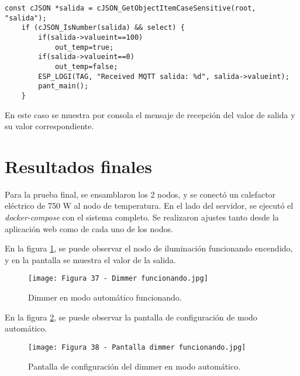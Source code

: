 
\begin{lstlisting}[caption={Muestra por consola de la terminal ESP-IDF.}, label={lst:dispositivo}]
const cJSON *salida = cJSON_GetObjectItemCaseSensitive(root, "salida");
    if (cJSON_IsNumber(salida) && select) {
        if(salida->valueint==100)
            out_temp=true;
        if(salida->valueint==0)
            out_temp=false;
        ESP_LOGI(TAG, "Received MQTT salida: %d", salida->valueint);
        pant_main();
    }
\end{lstlisting}

En este caso se muestra por consola el mensaje de recepción del valor de salida y su valor correspondiente.

\section{Resultados finales}

Para la prueba final, se ensamblaron los 2 nodos, y se conectó un calefactor eléctrico de 750 W al nodo de temperatura. En el lado del servidor, se ejecutó el \textit{docker-compose} con el sistema completo. Se realizaron ajustes tanto desde la aplicación web como de cada uno de los nodos.

En la figura \ref{fig:37}, se puede observar el nodo de iluminación funcionando encendido, y en la pantalla se muestra el valor de la salida.

\begin{figure}[h]
\centering
\texttt{[image: Figura 37 - Dimmer funcionando.jpg]}
\caption[Dimmer en modo automático funcionando]{Dimmer en modo automático funcionando.}
\label{fig:37}
\end{figure}

En la figura \ref{fig:38}, se puede observar la pantalla de configuración de modo automático.

\begin{figure}[h]
\centering
\texttt{[image: Figura 38 - Pantalla dimmer funcionando.jpg]}
\caption[Pantalla de configuración del dimmer en modo automático]{Pantalla de configuración del dimmer en modo automático.}
\label{fig:38}
\end{figure}

